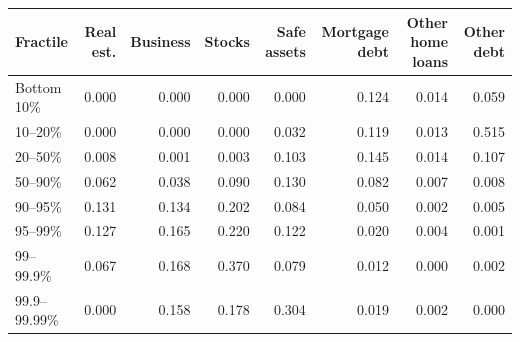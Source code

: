 \begin{tabular*}{\linewidth}{@{\extracolsep{\fill}}lrrrrrrr}\toprule
Fractile & Real est. & Business & Stocks & Safe assets & Mortgage debt & Other home loans & Other debt \\
\midrule
Bottom 10\% & 0.000 & 0.000 & 0.000 & 0.000 & 0.124 & 0.014 & 0.059 \\
10--20\% & 0.000 & 0.000 & 0.000 & 0.032 & 0.119 & 0.013 & 0.515 \\
20--50\% & 0.008 & 0.001 & 0.003 & 0.103 & 0.145 & 0.014 & 0.107 \\
50--90\% & 0.062 & 0.038 & 0.090 & 0.130 & 0.082 & 0.007 & 0.008 \\
90--95\% & 0.131 & 0.134 & 0.202 & 0.084 & 0.050 & 0.002 & 0.005 \\
95--99\% & 0.127 & 0.165 & 0.220 & 0.122 & 0.020 & 0.004 & 0.001 \\
99--99.9\% & 0.067 & 0.168 & 0.370 & 0.079 & 0.012 & 0.000 & 0.002 \\
99.9--99.99\% & 0.000 & 0.158 & 0.178 & 0.304 & 0.019 & 0.002 & 0.000 \\
\bottomrule
\end{tabular*}
